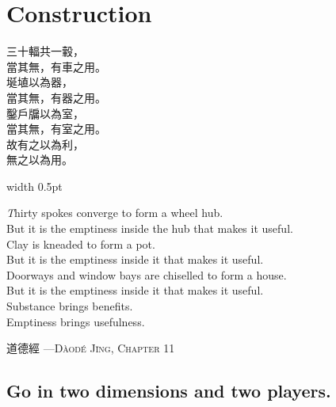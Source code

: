 {\centering
	\chapter{Construction}\label{parte2}}
\thispagestyle{empty}
\noindent
\begin{minipage}[t]{0.35\textwidth}
	\begin{flushright}
		\large
		\vspace{1pt}
		三十輻共一轂，\\
		當其無，有車之用。\\
		\vspace{0.5em}
		埏埴以為器，\\
		當其無，有器之用。\\
		\vspace{0.5em}
		鑿戶牖以為室，\\
		當其無，有室之用。\\
		\vspace{0.5em}
		故有之以為利，\\
		無之以為用。
	\end{flushright}
\end{minipage}%
\hfill
\vrule width 0.5pt %
\hfill
\begin{minipage}[t]{0.55\textwidth}
	\vspace{1pt}
	\raggedright
	\emph
	Thirty spokes converge to form a wheel hub.\\
	But it is the emptiness inside the hub that makes it useful.\\
	
	\vspace{0.8em}
	Clay is kneaded to form a pot.\\
	But it is the emptiness inside it that makes it useful.\\
	
	\vspace{0.8em}
	Doorways and window bays are chiselled to form a house.\\
	But it is the emptiness inside it that makes it useful.\\

	\vspace{0.8em}
	Substance brings benefits.\\
	Emptiness brings usefulness.
\end{minipage}

\vspace{1em}
\hfill {\normalfont  道德經 —\textsc{Dàodé Jīng, Chapter 11}}

\section{Go in two dimensions and two players.}

